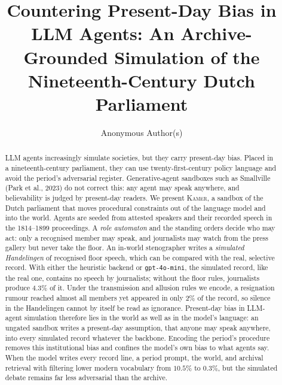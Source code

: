 \documentclass[sigconf,review,anonymous]{acmart}
\newcommand{\sys}{\textsc{Kamer}}
\begin{document}
\title[Countering Present-Day Bias in LLM Agents]{Countering Present-Day
Bias in LLM Agents: An Archive-Grounded Simulation of the Nineteenth-Century
Dutch Parliament}

\author{Anonymous Author(s)}

\renewcommand{\shortauthors}{Anonymous et al.}

\begin{abstract}
LLM agents increasingly simulate societies, but they carry present-day
bias. Placed in a nineteenth-century parliament, they can use
twenty-first-century policy language and avoid the period's adversarial
register. Generative-agent sandboxes such as Smallville (Park et al., 2023)
do not correct this: any agent may speak anywhere, and believability is
judged by present-day readers. We present \sys{}, a sandbox of the Dutch
parliament that moves procedural constraints out of the language model and
into the world. Agents are seeded from attested speakers and their
recorded speech in the 1814--1899 proceedings. A \emph{role automaton} and
the standing orders decide who may act: only a recognised member may
speak, and journalists may watch from the press gallery but never take
the floor. An in-world stenographer writes a \emph{simulated Handelingen}
of recognised floor speech, which can be compared with the real, selective
record. With either the heuristic backend or \texttt{gpt-4o-mini}, the
simulated record, like the real one, contains no speech by journalists;
without the floor rules, journalists produce $4.3\%$ of it. Under the
transmission and allusion rules we encode, a resignation rumour reached
almost all members yet appeared in only $2\%$ of the record, so silence in
the Handelingen cannot by itself be read as ignorance. Present-day bias in
LLM-agent simulation therefore lies in the world as well as in the model's
language: an ungated sandbox writes a present-day assumption, that anyone
may speak anywhere, into every simulated record whatever the backbone.
Encoding the period's procedure removes this institutional bias and
confines the model's own bias to what agents say. When the model writes
every record line, a period prompt, the world, and archival retrieval with
filtering lower modern vocabulary from $10.5\%$ to $0.3\%$, but the
simulated debate remains far less adversarial than the archive.
\end{abstract}
\end{document}
